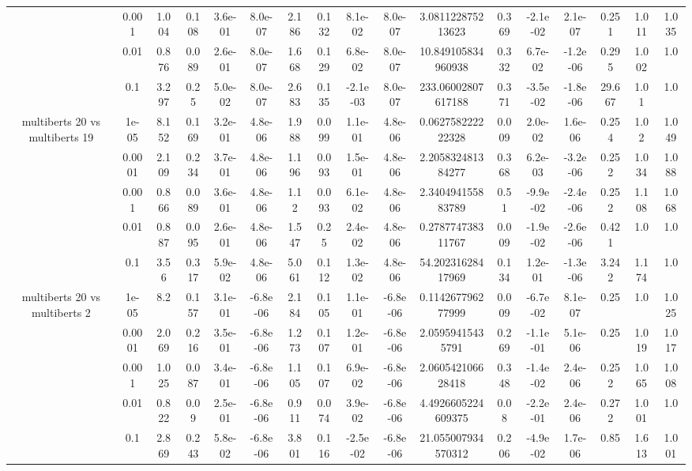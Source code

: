 \begin{tabular}{|c|c|c|c|c|c|c|c|c|c|c|c|c|c|c|c|c|}
 & 0.001 & 1.004 & 0.108 & 3.6e-01 & 8.0e-07 & 2.186 & 0.132 & 8.1e-02 & 8.0e-07 & 3.081122875213623 & 0.369 & -2.1e-02 & 2.1e-07 & 0.251 & 1.011 & 1.035 \\
 & 0.01 & 0.876 & 0.089 & 2.6e-01 & 8.0e-07 & 1.668 & 0.129 & 6.8e-02 & 8.0e-07 & 10.849105834960938 & 0.332 & 6.7e-02 & -1.2e-06 & 0.295 & 1.002 & 1.0 \\
 & 0.1 & 3.297 & 0.25 & 5.0e-02 & 8.0e-07 & 2.683 & 0.135 & -2.1e-03 & 8.0e-07 & 233.06002807617188 & 0.371 & -3.5e-02 & -1.8e-06 & 29.667 & 1.01 & 1.0 \\
\hline
\multirow{5}{*}{multiberts 20 vs multiberts 19} & 1e-05 & 8.152 & 0.169 & 3.2e-01 & 4.8e-06 & 1.988 & 0.099 & 1.1e-01 & 4.8e-06 & 0.062758222222328 & 0.009 & 2.0e-02 & 1.6e-06 & 0.254 & 1.02 & 1.049 \\
 & 0.0001 & 2.109 & 0.234 & 3.7e-01 & 4.8e-06 & 1.196 & 0.093 & 1.5e-01 & 4.8e-06 & 2.205832481384277 & 0.368 & 6.2e-03 & -3.2e-06 & 0.252 & 1.034 & 1.088 \\
 & 0.001 & 0.866 & 0.089 & 3.6e-01 & 4.8e-06 & 1.12 & 0.093 & 6.1e-02 & 4.8e-06 & 2.340494155883789 & 0.51 & -9.9e-02 & -2.4e-06 & 0.252 & 1.108 & 1.068 \\
 & 0.01 & 0.887 & 0.095 & 2.6e-01 & 4.8e-06 & 1.547 & 0.25 & 2.4e-02 & 4.8e-06 & 0.278774738311767 & 0.009 & -1.9e-02 & -2.6e-06 & 0.421 & 1.0 & 1.0 \\
 & 0.1 & 3.56 & 0.317 & 5.9e-02 & 4.8e-06 & 5.061 & 0.112 & 1.3e-02 & 4.8e-06 & 54.20231628417969 & 0.134 & 1.2e-01 & -1.3e-06 & 3.242 & 1.174 & 1.0 \\
\hline
\multirow{5}{*}{multiberts 20 vs multiberts 2} & 1e-05 & 8.2 & 0.157 & 3.1e-01 & -6.8e-06 & 2.184 & 0.105 & 1.1e-01 & -6.8e-06 & 0.114267796277999 & 0.009 & -6.7e-02 & 8.1e-07 & 0.25 & 1.0 & 1.025 \\
 & 0.0001 & 2.069 & 0.216 & 3.5e-01 & -6.8e-06 & 1.273 & 0.107 & 1.2e-01 & -6.8e-06 & 2.05959415435791 & 0.269 & -1.1e-01 & 5.1e-06 & 0.25 & 1.019 & 1.017 \\
 & 0.001 & 1.025 & 0.087 & 3.4e-01 & -6.8e-06 & 1.105 & 0.107 & 6.9e-02 & -6.8e-06 & 2.060542106628418 & 0.348 & -1.4e-02 & 2.4e-06 & 0.252 & 1.065 & 1.008 \\
 & 0.01 & 0.822 & 0.09 & 2.5e-01 & -6.8e-06 & 0.911 & 0.074 & 3.9e-02 & -6.8e-06 & 4.4926605224609375 & 0.08 & -2.2e-01 & 2.4e-06 & 0.272 & 1.001 & 1.0 \\
 & 0.1 & 2.869 & 0.243 & 5.8e-02 & -6.8e-06 & 3.801 & 0.116 & -2.5e-02 & -6.8e-06 & 21.055007934570312 & 0.206 & -4.9e-02 & 1.7e-06 & 0.85 & 1.613 & 1.001 \\

\end{tabular}
